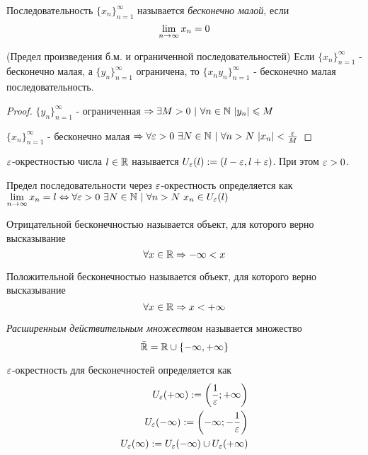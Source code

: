 \begin{definition}
	Последовательность $\{x_n\}_{n = 1}^\infty$ называется \textit{бесконечно малой}, если 
	$$
		\lim\limits_{n \rightarrow \infty} x_n = 0
	$$
\end{definition}

\begin{theorem} (Предел произведения б.м. и ограниченной последовательностей)
	Если $\{x_n\}_{n = 1}^\infty$ - бесконечно малая, а $\{y_n\}_{n = 1}^\infty$ ограничена, то $\{x_ny_n\}_{n = 1}^\infty$ - бесконечно малая последовательность.
\end{theorem}

\begin{proof}
	$\{y_n\}_{n = 1}^\infty$ - ограниченная $\Ra \exists M > 0\ |\ \forall n \in \N\ |y_n| \le M$
	
	$\{x_n\}_{n = 1}^\infty$ - бесконечно малая $\Ra \forall \eps > 0\ \exists N \in \N\ |\ \forall n > N\ |x_n| < \frac{\eps}{M}$
\end{proof}

\begin{definition}
	$\varepsilon$-окрестностью числа $l \in \mathbb{R}$ называется $U_{\varepsilon}(l) := (l - \varepsilon, l + \varepsilon)$. При этом $\varepsilon > 0$.
\end{definition}

\begin{definition}
	Предел последовательности через $\varepsilon$-окрестность определяется как $\lim\limits_{n \rightarrow \infty} x_n = l \Leftrightarrow \forall \varepsilon > 0\ \exists N \in \mathbb{N}\ |\ \forall n > N\ x_n \in U_{\varepsilon}(l)$
\end{definition}

\begin{definition}
	Отрицательной бесконечностью называется объект, для которого верно высказывание
	$$
		\forall x \in \mathbb{R} \Rightarrow -\infty < x
	$$
\end{definition}

\begin{definition}
	Положительной бесконечностью называется объект, для которого верно высказывание
	$$
		\forall x \in \mathbb{R} \Rightarrow x < +\infty
	$$
\end{definition}

\begin{definition}
	\textit{Расширенным действительным множеством} называется множество
	$$
		\bar{\mathbb{R}} = \mathbb{R} \cup \{-\infty, +\infty\}
	$$
\end{definition}

\begin{definition}
	$\varepsilon$-окрестность для бесконечностей определяется как
	\begin{align*}
		U_{\varepsilon}(+\infty) := \left(\frac{1}{\varepsilon}; +\infty\right)
		\\
		U_{\varepsilon}(-\infty) := \left(-\infty; -\frac{1}{\varepsilon}\right)
		\\
		U_{\varepsilon}(\infty) := U_{\varepsilon}(-\infty) \cup U_{\varepsilon}(+\infty)
	\end{align*}
\end{definition}

